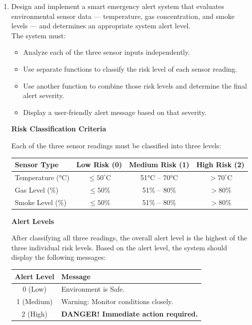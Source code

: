 \documentclass[12pt]{article}
\begin{document}
\begin{enumerate}
    \item \noindent Design and implement a smart emergency alert system that evaluates environmental sensor data — temperature, gas concentration, and smoke levels — and determines an appropriate system alert level. \\

\noindent The system must:

\begin{itemize}
    \item Analyze each of the three sensor inputs independently.
    \item Use separate functions to classify the risk level of each sensor reading.
    \item Use another function to combine those risk levels and determine the final alert severity.
    \item Display a user-friendly alert message based on that severity.
\end{itemize}

\noindent \textbf{Risk Classification Criteria}

\noindent Each of the three sensor readings must be classified into three levels:

\begin{center}
\begin{tabular}{|l|c|c|c|}
\hline
\textbf{Sensor Type} & \textbf{Low Risk (0)} & \textbf{Medium Risk (1)} & \textbf{High Risk (2)} \\
\hline
Temperature (°C) & $\leq 50^\circ$C & 51°C – 70°C & $> 70^\circ$C \\
Gas Level (\%) & $\leq 50\%$ & 51\% – 80\% & $> 80\%$ \\
Smoke Level (\%) & $\leq 50\%$ & 51\% – 80\% & $> 80\%$ \\
\hline
\end{tabular}
\end{center}

\noindent \textbf{Alert Levels} 

\noindent After classifying all three readings, the overall alert level is the highest of the three individual risk levels. Based on the alert level, the system should display the following messages: 

\begin{center}
\begin{tabular}{|c|l|}
\hline
\textbf{Alert Level} & \textbf{Message} \\
\hline
0 (Low) & Environment is Safe. \\
1 (Medium) & Warning: Monitor conditions closely. \\
2 (High) & \textbf{DANGER! Immediate action required.} \\
\hline
\end{tabular}
\end{center}


\end{enumerate}
\end{document}
